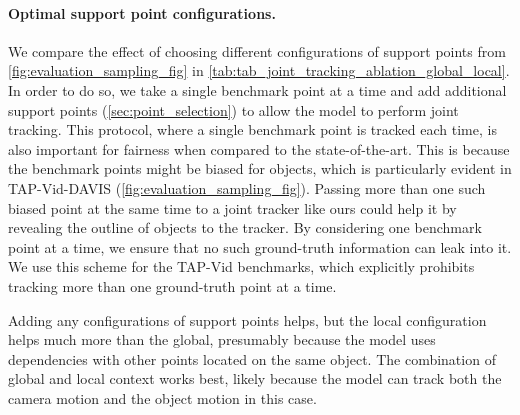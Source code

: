 \begin{table}[tb]
    \begin{minipage}{.50\linewidth}
        \centering
        \setlength\tabcolsep{0.9pt}
       
    \end{minipage}%
    \hspace{0.02\linewidth}
    \begin{minipage}{0.45\linewidth}
        \centering
        \setlength\tabcolsep{1pt}
        
    \end{minipage}
\end{table}

\paragraph{Optimal support point configurations.}

We compare the effect of choosing different configurations of support points from \cref{fig:evaluation_sampling_fig} in \cref{tab:tab_joint_tracking_ablation_global_local}.
In order to do so, we take a single benchmark point at a time and add additional support points (\cref{sec:point_selection}) to allow the model to perform joint tracking.
This protocol, where a single benchmark point is tracked each time, is also important for fairness when compared to the state-of-the-art.
This is because the benchmark points might be biased for objects, which is particularly evident in TAP-Vid-DAVIS (\cref{fig:evaluation_sampling_fig}).
Passing more than one such biased point at the same time to a joint tracker like ours could help it by revealing the outline of objects to the tracker.
By considering one benchmark point at a time, we ensure that no such ground-truth information can leak into it.
We use this scheme for the TAP-Vid benchmarks, which explicitly prohibits tracking more than one ground-truth point at a time.

Adding any configurations of support points helps, but the local configuration helps much more than the global, presumably because the model uses dependencies with other points located on the same object.
The combination of global and local context works best, likely because the model can track both the camera motion and the object motion in this case.






